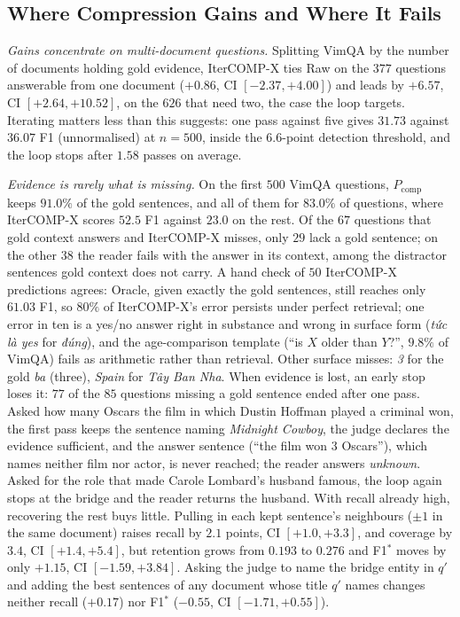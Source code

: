 \documentclass[runningheads]{llncs}
\begin{document}
\subsection{Where Compression Gains and Where It Fails}
\label{sec:loss}
\emph{Gains concentrate on multi-document questions.} Splitting VimQA by the
number of documents holding gold evidence, IterCOMP-X ties Raw on the $377$
questions answerable from one document ($+0.86$, CI $[-2.37,+4.00]$) and leads by
$+6.57$, CI $[+2.64,+10.52]$, on the $626$ that need two, the case the loop
targets. Iterating matters less than this suggests: one pass against five gives
$31.73$ against $36.07$ F1 (unnormalised) at $n=500$, inside the $6.6$-point detection
threshold, and the loop stops after $1.58$ passes on average.

\emph{Evidence is rarely what is missing.} On the first $500$ VimQA questions,
$P_{\text{comp}}$ keeps $91.0\%$ of the gold sentences, and all of them for
$83.0\%$ of questions, where IterCOMP-X scores $52.5$ F1 against $23.0$ on the
rest. Of the $67$ questions that gold context answers and IterCOMP-X misses,
only $29$ lack a gold sentence; on the other $38$ the reader fails with the
answer in its context, among the distractor sentences gold context does not
carry. A hand check of $50$ IterCOMP-X predictions agrees: Oracle, given exactly
the gold sentences, still reaches only $61.03$ F1, so $80\%$ of IterCOMP-X's error
persists under perfect retrieval; one error in ten is a yes/no answer right in
substance and wrong in surface form (\emph{tức là yes} for \emph{đúng}), and the
age-comparison template (``is $X$ older than $Y$?'', $9.8\%$ of VimQA) fails as
arithmetic rather than retrieval. Other surface misses: \emph{3} for the gold
\emph{ba} (three), \emph{Spain} for \emph{Tây Ban Nha}. When evidence is lost, an
early stop loses it: $77$ of the $85$ questions missing a gold sentence ended
after one pass. Asked how many Oscars the film in which Dustin Hoffman played a
criminal won, the first pass keeps the sentence naming \emph{Midnight Cowboy},
the judge declares the evidence sufficient, and the answer sentence (``the film
won 3 Oscars''), which names neither film nor actor, is never reached; the
reader answers \emph{unknown}. Asked for the role that made Carole Lombard's
husband famous, the loop again stops at the bridge and the reader returns the
husband. With recall already high, recovering the rest buys little. Pulling in each
kept sentence's neighbours ($\pm1$ in the same document) raises recall by $2.1$
points, CI $[+1.0,+3.3]$, and coverage by $3.4$, CI $[+1.4,+5.4]$, but retention
grows from $0.193$ to $0.276$ and F1$^*$ moves by only $+1.15$, CI
$[-1.59,+3.84]$. Asking the judge to name the bridge entity in $q'$ and adding
the best sentences of any document whose title $q'$ names changes neither recall
($+0.17$) nor F1$^*$ ($-0.55$, CI $[-1.71,+0.55]$).
\end{document}
